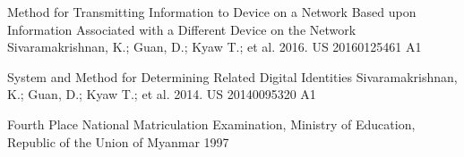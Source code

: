 

\begin{cvpatents}

  \cvpatent
  {Method for Transmitting Information to Device on a Network Based upon Information Associated with a Different Device on the Network} %
  {Sivaramakrishnan, K.; Guan, D.; Kyaw T.; et al. 2016.} %
  {US 20160125461 A1} %

  \cvpatent
  {System and Method for Determining Related Digital Identities} %
  {Sivaramakrishnan, K.; Guan, D.; Kyaw T.; et al. 2014.} %
  {US 20140095320 A1} %

  \cvpatent
  {Fourth Place} %
  {National Matriculation Examination, Ministry of Education, Republic of the Union of Myanmar} %
  {1997} %

\end{cvpatents}
